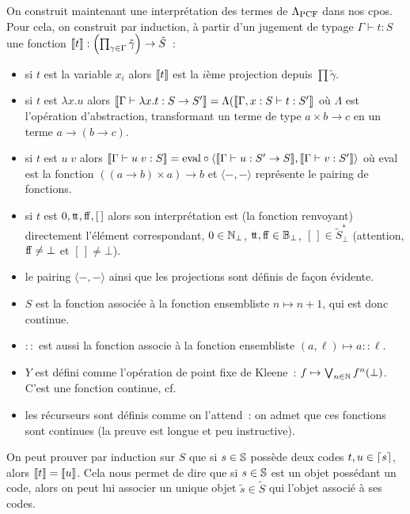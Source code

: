 \documentclass{article}
\begin{document}
On construit maintenant une interprétation des termes de $\Lambda_{\mathrm{PCF}}$ dans nos cpos. Pour cela, on construit par induction, à partir d'un jugement de typage $\Gamma\vdash t : S$ une fonction $\llbracket t \rrbracket : \left(\prod_{\gamma \in \Gamma} \tilde\gamma\right) \to \tilde S$~:
\begin{itemize}
    \item si $t$ est la variable $x_i$ alors $\llbracket t \rrbracket$ est la $i$ème projection depuis $\prod \tilde \gamma$.
    \item si $t$ est $\lambda x.u$ alors $\llbracket \Gamma\vdash \lambda x. t : S \to S' \rrbracket = \Lambda(\llbracket \Gamma, x : S\vdash t : S' \rrbracket$ où $\Lambda$ est l'opération d'abstraction, transformant un terme de type $a\times b \to c$ en un terme $a \to (b \to c)$.
    \item si $t$ est $u\;v$ alors $\llbracket \Gamma\vdash u\;v : S \rrbracket = \mathrm{eval}\circ \langle \llbracket \Gamma\vdash u : S' \to S \rrbracket, \llbracket \Gamma\vdash v : S' \rrbracket\rangle$ où eval est la fonction $((a\to b)\times a) \to b$ et $\langle -,-\rangle$ représente le pairing de fonctions.
    \item si $t$ est $0,\mathrm{t}\!\mathrm{t},\mathrm{f}\!\mathrm{f},[\,]$ alors son interprétation est (la fonction renvoyant) directement l'élément correspondant, $0 \in \mathbb{N}_\bot$, $\mathrm{t}\!\mathrm{t}, \mathrm{f}\!\mathrm{f} \in \mathbb{B}_\bot$, $[\,] \in \tilde S^*_\bot$ (attention, $\mathrm{f}\!\mathrm{f} \neq \bot$ et $[\,] \neq \bot$).
    \item le pairing $\langle -,-\rangle$ ainsi que les projections sont définis de façon évidente.
    \item $S$ est la fonction associée à la fonction ensembliste $n \mapsto n + 1$, qui est donc continue.
    \item $::$ est aussi la fonction associe à la fonction ensembliste $(a,\ell) \mapsto a :: \ell$.
    \item $Y$ est défini comme l'opération de point fixe de Kleene~: $f \mapsto \bigvee_{n \in \mathbb{N}} f^n(\bot)$. C'est une fonction continue, cf\cite{Amadio_Curien_1998}.
    \item les récurseurs sont définis comme on l'attend~: on admet que ces fonctions sont continues (la preuve est longue et peu instructive).
\end{itemize}

On peut prouver par induction  sur $S$ que si $s \in \mathbb{S}$ possède deux codes $t,u \in \lceil s \rceil$, alors $\llbracket t \rrbracket = \llbracket u \rrbracket$. Cela nous permet de dire que si $s \in \mathbb{S}$ est un objet possédant un code, alors on peut lui associer un unique objet $\tilde s \in \tilde S$ qui l'objet associé à ses codes.
\end{document}
